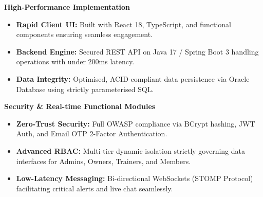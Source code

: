 \documentclass[14pt]{extarticle}
\begin{document}
\begin{tcolorbox}[colframe=itmred, colback=white, boxrule=3pt, arc=0pt, outer arc=0pt, 
                  width=\textwidth, height=\textheight, enlarge top by=-1cm, enlarge bottom by=-1cm]
\begin{minipage}[t]{0.59\textwidth}
    \begin{tcolorbox}[colback=lightbluetable, colframe=itmblue, boxrule=1pt, arc=2pt, left=4pt, right=4pt, top=3pt, bottom=3pt]
    \textbf{High-Performance Implementation}
    \begin{itemize}
        \item \textbf{Rapid Client UI:} Built with React 18, TypeScript, and functional components ensuring seamless engagement.
        \item \textbf{Backend Engine:} Secured REST API on Java 17 / Spring Boot 3 handling operations with under 200ms latency.
        \item \textbf{Data Integrity:} Optimised, ACID-compliant data persistence via Oracle Database using strictly parameterised SQL.
    \end{itemize}
    \end{tcolorbox}
    
    \vspace{0.05cm}
    
    \begin{tcolorbox}[colback=white, colframe=itmred, boxrule=1pt, arc=2pt, left=4pt, right=4pt, top=3pt, bottom=3pt]
    \textbf{Security \& Real-time Functional Modules}
    \begin{itemize}
        \item \textbf{Zero-Trust Security:} Full OWASP compliance via BCrypt hashing, JWT Auth, and Email OTP 2-Factor Authentication.
        \item \textbf{Advanced RBAC:} Multi-tier dynamic isolation strictly governing data interfaces for Admins, Owners, Trainers, and Members.
        \item \textbf{Low-Latency Messaging:} Bi-directional WebSockets (STOMP Protocol) facilitating critical alerts and live chat seamlessly.
    \end{itemize}
    \end{tcolorbox}
\end{minipage}

\vspace{0.15cm}



\end{tcolorbox}
\end{document}
